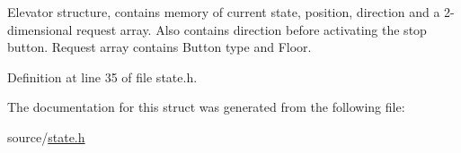 Elevator structure, contains memory of current state, position, direction and a 2-\/dimensional request array. Also contains direction before activating the stop button. Request array contains Button type and Floor. 

Definition at line 35 of file state.\+h.



The documentation for this struct was generated from the following file\+:\begin{DoxyCompactItemize}
\item 
source/\mbox{\hyperlink{state_8h}{state.\+h}}\end{DoxyCompactItemize}
